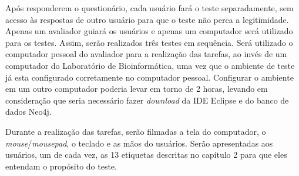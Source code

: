 \indent Após responderem o questionário, cada usuário fará o teste separadamente, sem acesso às respostas de outro usuário para que o teste não perca a legitimidade. Apenas um avaliador guiará os usuários e apenas um computador será utilizado para os testes. Assim, serão realizados três testes em sequência. Será utilizado o computador pessoal do avaliador para a realização das tarefas, ao invés de um computador do Laboratório de Bioinformática, uma vez que o ambiente de teste já esta configurado corretamente no computador pessoal. Configurar o ambiente em um outro computador poderia levar em torno de 2 horas, levando em consideração que seria necessário fazer \textit{download} da IDE Eclipse e do banco de dados Neo4j.

\indent Durante a realização das tarefas, serão filmadas a tela do computador, o \textit{mouse}/\textit{mousepad}, o teclado e as mãos do usuários. Serão apresentadas aos usuários, um de cada vez, as 13 etiquetas descritas no capítulo 2 para que eles entendam o propósito do teste.




